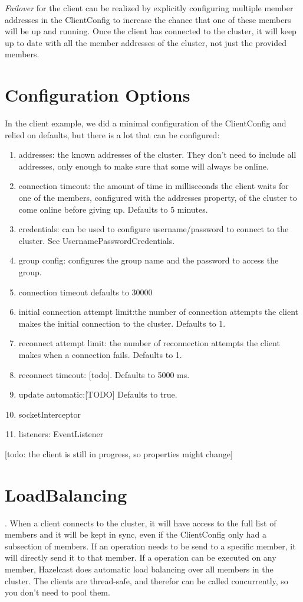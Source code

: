 \emph{Failover} for the client can be realized by explicitly configuring multiple member addresses in the ClientConfig to increase the chance that one of these members will be up and running. Once the client has connected to the cluster, it will keep up to date with all the member addresses of the cluster, not just the provided members.

\section{Configuration Options}
In the client example, we did a minimal configuration of the ClientConfig and relied on defaults, but there is a lot that can be configured:
\begin{enumerate}
\item addresses: the known addresses of the cluster. They don't need to include all addresses, only enough to make sure that some will always be online.
\item connection timeout: the amount of time in milliseconds the client waits for one of the members, configured with the addresses property, of the cluster to come online before giving up. Defaults to 5 minutes.
\item credentials: can be used to configure username/password to connect to the cluster. See UsernamePasswordCredentials.
\item group config: configures the group name and the password to access the group.
\item connection timeout defaults to 30000
\item initial connection attempt limit:the  number of connection attempts the client makes the initial connection to the cluster. Defaults to 1.
\item reconnect attempt limit: the number of reconnection attempts the client makes when a connection fails. Defaults to 1.
\item reconnect timeout: [todo]. Defaults to 5000 ms.
\item update automatic:[TODO] Defaults to true.
\item socketInterceptor
\item listeners: EventListener
\end{enumerate}
[todo: the client is still in progress, so properties might change]

\section{LoadBalancing}.
When a client connects to the cluster, it will have access to the full list of members and it will be kept in sync, even if the ClientConfig only had a subsection of members. If an operation needs to be send to a specific member, it will directly send it to that member. If a operation can be executed on any member, Hazelcast does automatic load balancing over all members in the cluster. The clients are thread-safe, and therefor can be called concurrently, so you don't need to pool them.

